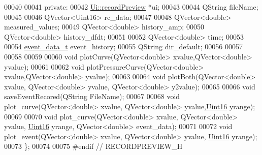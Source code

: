\begin{DoxyCode}
00040 
00041 \textcolor{keyword}{private}:
00042     \hyperlink{a00074}{Ui::recordPreview} *ui;
00043 
00044     QString fileName;
00045 
00046     QVector<Uint16> rc\_data;
00047 
00048     QVector<double> measured\_values;
00049     QVector<double> history\_amp;
00050     QVector<double> history\_dfdt;
00051 
00052     QVector<double> time;
00053 
00054     \hyperlink{a00006_d6/d7d/a00161}{event\_data\_t} event\_history;
00055     QString dir\_default;
00056 
00057 
00058 
00059 
00060     \textcolor{keywordtype}{void} plotCurve(QVector<double> xvalue,QVector<double> yvalue);
00061 
00062     \textcolor{keywordtype}{void} plotPressureCurve(QVector<double> xvalue,QVector<double> yvalue);
00063 
00064     \textcolor{keywordtype}{void} plotBoth(QVector<double> xvalue, QVector<double> yvalue, QVector<double> y2value);
00065 
00066     \textcolor{keywordtype}{void} saveEventRecored(QString FileName);
00067 
00068     \textcolor{keywordtype}{void} plot\_curve(QVector<double> xvalue, QVector<double> yvalue,\hyperlink{a00004_aae7407b021d43f7193a81a58cfb3e297}{Uint16} yrange);
00069 
00070     \textcolor{keywordtype}{void} plot\_curve(QVector<double> xvalue, QVector<double> yvalue, \hyperlink{a00004_aae7407b021d43f7193a81a58cfb3e297}{Uint16} yrange, QVector<double> 
      event\_data);
00071 
00072     \textcolor{keywordtype}{void} plot\_event(QVector<double> xvalue, QVector<double> yvalue, \hyperlink{a00004_aae7407b021d43f7193a81a58cfb3e297}{Uint16} yrange);
00073 \};
00074 
00075 \textcolor{preprocessor}{#endif // RECORDPREVIEW\_H}
\end{DoxyCode}
